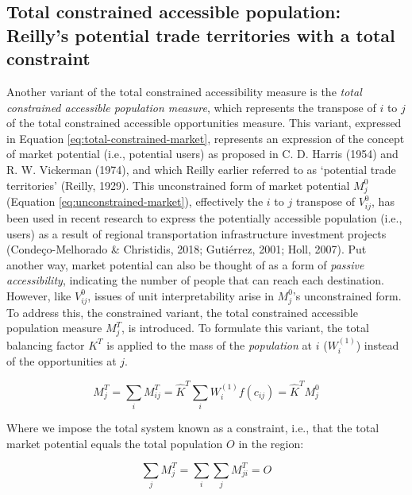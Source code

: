 \documentclass[
11pt, %
oneside, %
english, %
singlespacing, %
]{macthesis} %
\begin{document}
\subsection{Total constrained accessible population: Reilly's potential trade territories with a total constraint}\label{total-constrained-accessible-population-reillys-potential-trade-territories-with-a-total-constraint}

Another variant of the total constrained accessibility measure is the \emph{total constrained accessible population measure}, which represents the transpose of \(i\) to \(j\) of the total constrained accessible opportunities measure. This variant, expressed in Equation \ref{eq:total-constrained-market}, represents an expression of the concept of market potential (i.e., potential users) as proposed in C. D. Harris (1954) and R. W. Vickerman (1974), and which Reilly earlier referred to as `potential trade territories' (Reilly, 1929). This unconstrained form of market potential \(M_j^0\) (Equation \ref{eq:unconstrained-market}), effectively the \(i\) to \(j\) transpose of \(V^0_{ij}\), has been used in recent research to express the potentially accessible population (i.e., users) as a result of regional transportation infrastructure investment projects (Condeço-Melhorado \& Christidis, 2018; Gutiérrez, 2001; Holl, 2007). Put another way, market potential can also be thought of as a form of \emph{passive accessibility}, indicating the number of people that can reach each destination. However, like \(V_{ij}^0\), issues of unit interpretability arise in \(M_j^0\)'s unconstrained form. To address this, the constrained variant, the total constrained accessible population measure \(M^T_{j}\), is introduced. To formulate this variant, the total balancing factor \(K^T\) is applied to the mass of the \emph{population} at \(i\) (\(W_i^{(1)}\)) instead of the opportunities at \(j\).

\begin{equation}
\label{eq:total-constrained-market}
M^T_{j} = \sum_i M^T_{ij} = \hat K^T \sum_i W_i^{(1)} f(c_{ij}) = \hat K^T M_{j}^0
\end{equation} 

Where we impose the total system known as a constraint, i.e., that the total market potential equals the total population \(O\) in the region:

\begin{equation}
\label{eq:total-constraint-market}
\sum_j M^T_{j} = \sum_i\sum_j M^T_{ji} = O
\end{equation} 
\end{document}
